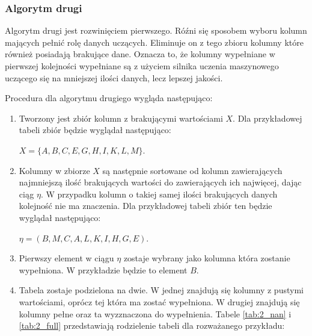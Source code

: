 \documentclass[12pt,twoside]{article}
\begin{document}
\subsubsection{Algorytm drugi}

Algorytm drugi jest rozwinięciem pierwszego. Róźni się sposobem wyboru kolumn mających pełnić rolę
danych uczących. Eliminuje on z tego zbioru kolumny które również posiadają brakujące dane.
Oznacza to, że kolumny wypełniane w pierwszej kolejności wypełniane są z użyciem silnika uczenia maszynowego
uczącego się na mniejszej ilości danych, lecz lepszej jakości.

Procedura dla algorytmu drugiego wygląda następująco:

\begin{enumerate}[label=\arabic*), leftmargin=1.25cm]
    \item Tworzony jest zbiór kolumn z brakującymi wartościami $X$.
          Dla przykładowej tabeli zbiór będzie wyglądał następująco:

          $X=\{A,B,C,E,G,H,I,K,L,M\}$.
    \item Kolumny w zbiorze $X$ są następnie sortowane od kolumn zawierających
          najmniejszą ilość brakujących wartości do zawierających ich najwięcej, dając ciąg $\eta$.
          W przypadku kolumn o takiej samej ilości brakujących danych kolejność nie ma znaczenia.
          Dla przykładowej tabeli zbiór ten będzie wyglądał następująco:

          $\eta=(B,M,C,A,L,K,I,H,G,E)$.
    \item Pierwszy element w ciągu $\eta$ zostaje wybrany jako kolumna która zostanie wypełniona.
          W przykładzie będzie to element $B$.
    \item Tabela zostaje podzielona na dwie. W jednej znajdują się kolumny z pustymi wartościami,
          oprócz tej która ma zostać wypełniona.
          W drugiej znajdują się kolumny pełne oraz ta wyzznaczona do wypełnienia.
          Tabele \ref{tab:2_nan} i \ref{tab:2_full} przedstawiają rodzielenie tabeli dla rozważanego przykładu:


\end{enumerate}
\end{document}
